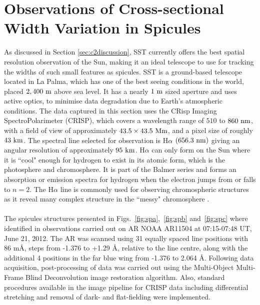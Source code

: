 \documentclass[12pt]{ociamthesis}
\newcommand{\np}{\\ \\}
\newcommand{\angstrom}{\textup{\AA}}
\begin{document}
\section{Observations of Cross-sectional Width Variation in Spicules}
\label{sec:CSW_spicules}
As discussed in Section \ref{sec:c2discussion}, SST currently offers the best spatial resolution observation of the Sun, making it an ideal telescope to use for tracking the widths of such small features as spicules. SST is a ground-based telescope located in La Palma, which has one of the best seeing conditions in the world, placed $2,400~\rm{m}$ above sea level. It has a nearly $1~\rm{m}$ sized aperture and uses active optics, to minimise data degradation due to Earth's atmospheric conditions. The data captured in this section uses the CRisp Imaging SpectroPolarimeter (CRISP), which covers a wavelength range of $510$ to $860~\rm{nm}$, with a field of view of approximately $43.5\times43.5~\rm{Mm}$, and a pixel size of roughly $43~\rm{km}$. The spectral line selected for observation is H$\alpha$ $(656.3~\rm{nm})$ giving an angular resolution of approximately $95~\rm{km}$. H$\alpha$ can only form on the Sun where it is ``cool" enough for hydrogen to exist in its atomic form, which is the photosphere and chromosphere. It is part of the Balmer series and forms an absorption or emission spectra for hydrogen when the electron jumps from or falls to $n=2$. The H$\alpha$ line is commonly used for observing chromospheric structures as it reveal many complex structure in the ``messy" chromosphere \citep[\textit{etc.}]{Parmenter1966PASP78250P, von1985AA146192V, Nishikawa1988PASJ40613N, Judge2006ASPC354259J, Leenaarts2007AA473625L, Rutten2008ASPC39754R, Jess2012, Pereira2016ApJ82465P, Rutten2017AA598A89R}. \np
%
The spicules structures presented in Figs.~\ref{fig:spa},~\ref{fig:spb} and~\ref{fig:spc} where identified in observations carried out on AR NOAA AR11504 at 07:15-07:48 UT, June 21, 2012. The AR was scanned using 31 equally spaced line positions with 86 m\angstrom, steps from -1.376 to +1.29 \AA, relative to the line centre, along with the additional 4 positions in the far blue wing from -1.376 to 2.064 \AA. Following data acquisition, post-processing of data was carried out using the Multi-Object Multi-Frame Blind Deconvolution \citep [MOMFBD;][]{2005} image restoration algorithm. Also, standard procedures available in the image pipeline for CRISP data \citep{2015} including differential stretching and removal of dark- and flat-fielding were implemented. \np
%
\end{document}
